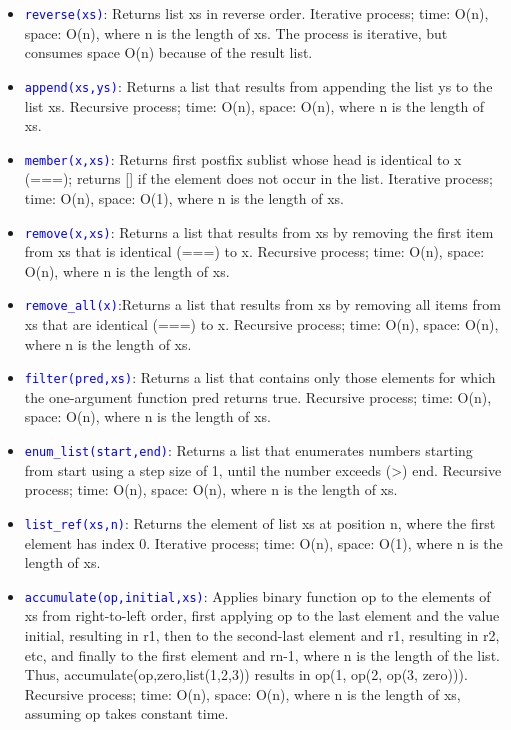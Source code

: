 \documentclass[10pt,portrait,a4paper]{article}
\newcommand\codeblue[1]{\textcolor{blue}{\code{#1}}}
\def\code#1{\texttt{#1}}
\begin{document}
\begin{multicols*}{4}
\begin{itemize}
      \item \codeblue{reverse(xs)}: Returns list xs in reverse order. Iterative process; time: O(n), space: O(n), where n is the length of xs. The process is iterative, but consumes space O(n) because of the result list.
      \item \codeblue{append(xs,ys)}: Returns a list that results from appending the list ys to the list xs. Recursive process; time: O(n), space: O(n), where n is the length of xs.
      \item \codeblue{member(x,xs)}: Returns first postfix sublist whose head is identical to x (===); returns [] if the element does not occur in the list. Iterative process; time: O(n), space: O(1), where n is the length of xs.
      \item \codeblue{remove(x,xs)}: Returns a list that results from xs by removing the first item from xs that is identical (===) to x. Recursive process; time: O(n), space: O(n), where n is the length of xs.
      \item \codeblue{remove\_all(x)}:Returns a list that results from xs by removing all items from xs that are identical (===) to x. Recursive process; time: O(n), space: O(n), where n is the length of xs.
      \item \codeblue{filter(pred,xs)}: Returns a list that contains only those elements for which the one-argument function pred returns true. Recursive process; time: O(n), space: O(n), where n
      is the length of xs.
      \item \codeblue{enum\_list(start,end)}: Returns a list that enumerates numbers starting from start using a step size of 1, until the number exceeds (>) end. Recursive process; time: O(n), space: O(n), where n is the length of xs.
      \item \codeblue{list\_ref(xs,n)}: Returns the element of list xs at position n, where the first element has index 0. Iterative process; time: O(n), space: O(1), where n is the length of xs.
      \item \codeblue{accumulate(op,initial,xs)}: Applies binary function op to the elements of xs from right-to-left order, first applying op to the last element and the value initial, resulting in r1, then to the second-last element and r1, resulting in r2, etc, and finally to the first element and rn-1, where n is the length of the list. Thus, accumulate(op,zero,list(1,2,3)) results in op(1, op(2, op(3, zero))). Recursive process; time: O(n), space: O(n), where n is the length of xs, assuming op takes constant time.
      \end{itemize}

\end{multicols*}
\end{document}
